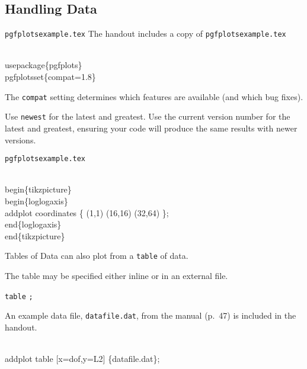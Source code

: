 \subsection{Handling Data}

\begin{frame}[fragile]{\texttt{pgfplotsexample.tex}}
  The handout includes a copy of \texttt{pgfplotsexample.tex}
  \begin{semiverbatim}
    \\usepackage\{pgfplots\}
    \alert<2>{\\pgfplotsset\{compat=1.8\}}
  \end{semiverbatim}
  The \verb|compat| setting determines which features are available (and which bug fixes).

  Use \verb|newest| for the latest and greatest.
%
  Use the current version number for the latest and greatest, ensuring your code will produce the same results with newer versions.
\end{frame}



\begin{frame}[fragile]{\texttt{pgfplotsexample.tex}}
  \begin{semiverbatim}
    \alert<2>{\\begin\{tikzpicture\}}
      \alert<3>{\\begin\{loglogaxis\}}
        \alert<4>{\\addplot} \alert<5>{coordinates} \alert<6>{\{
          (1,1)
          (16,16)
          (32,64)
        \}}\alert<7>{;}
      \alert<3>{\\end\{loglogaxis\}}
    \alert<2>{\\end\{tikzpicture\}}
  \end{semiverbatim}
\end{frame}

\begin{frame}[fragile]{Tables of Data}
  \pgfplots{} can also plot from a \verb|table| of data.

  The table may be specified either inline or in an external file.

   \alert<2,6>{\texttt{table}} \alert<3,7-9>{} \alert<4,10>{}\texttt{;}

  An example data file, \alert<10>{\texttt{datafile.dat}}, from the manual (p.~47) is included in the handout.

  \begin{semiverbatim}
    \\addplot \alert<6>{table} \alert<7>{[}\alert<7,8>{x=dof}\alert<7>{,}\alert<7,9>{y=L2}\alert<7>{]} \alert<10>{\{datafile.dat\}};
  \end{semiverbatim}

\end{frame}

